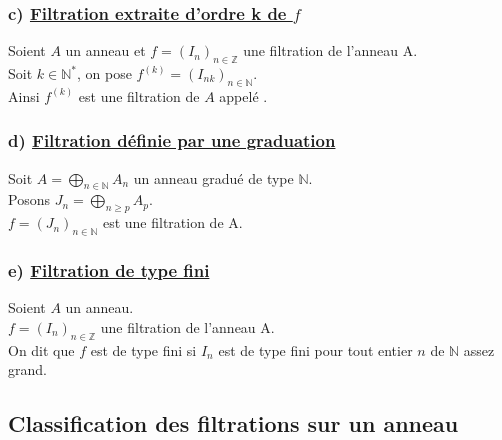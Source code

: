 \subsubsection{c) \underline{Filtration extraite d'ordre k de $f$}}
\begin{madefinition}
	Soient $A$ un anneau et $f = (I_n)_{n\in \mathbb{Z}}$ une filtration de l'anneau A.\\
	Soit $k \in \mathbb{N}^{*}$, on pose $f^{(k)} = (I_{nk})_{n\in \mathbb{N}}$.\\ 
	Ainsi $f^{(k)}$ est une filtration de $A$ appelé .
\end{madefinition}

\subsubsection{d) \underline{Filtration définie par une graduation}}
\begin{madefinition}
	Soit $A = \displaystyle \bigoplus_{n \in \mathbb{N}}{A_n}$ un anneau gradué de type $\mathbb{N}$.\\ Posons $J_n = \displaystyle \bigoplus_{n \geqslant p }{A_p}$.\\
	$f=(J_n)_{n \in \mathbb{N}}$ est une filtration de A. 
\end{madefinition}
\subsubsection{e) \underline{Filtration de type fini}}
\begin{madefinition}
	Soient $A$ un anneau.\\
	$f = (I_n)_{n\in \mathbb{Z}}$ une filtration de l'anneau A.\\
	On dit que $f$ est de type fini si $I_n$ est de type fini pour tout entier $n$ de $\mathbb{N}$ assez grand.
\end{madefinition}

\subsection{Classification des filtrations sur un anneau}
